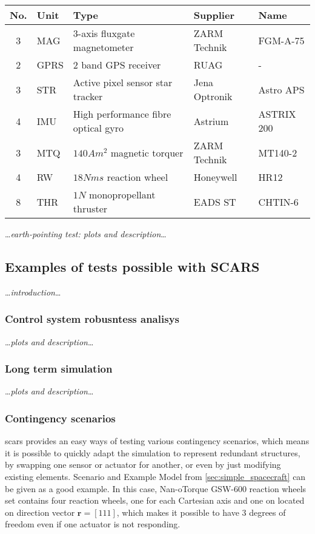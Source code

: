     \begin{center}    
        \small
        \begin{tabularx}{\textwidth}{ c l X l l }
            \textbf{No.} & \textbf{Uni}t & \textbf{Type} & \textbf{Supplier} & \textbf{Name} \\ \hline
            3 & MAG & 3-axis fluxgate magnetometer & ZARM Technik & FGM-A-75 \\
            2 & GPRS & 2 band GPS receiver & RUAG & - \\
            3 & STR  & Active pixel sensor star tracker & Jena Optronik & Astro APS \\
            4 & IMU & High performance fibre optical gyro & Astrium & ASTRIX 200 \\
            3 & MTQ & $140 Am^2$ magnetic torquer & ZARM Technik & MT140-2\\
            4 & RW & $18 Nms$ reaction wheel & Honeywell & HR12 \\
            8 & THR & $1N$ monopropellant thruster & EADS ST &CHTIN-6
        \end{tabularx}
    \end{center}\label{table:sentinel-adcs}

    \dots\textit{earth-pointing test: plots and description}\dots

\subsection{Examples of tests possible with SCARS}
    \dots\textit{introduction}\dots

    \subsubsection{Control system robusntess analisys}
    
        \dots\textit{plots and description}\dots
        

    \subsubsection{Long term simulation}
        \dots\textit{plots and description}\dots

    \subsubsection{Contingency scenarios}
        \ac{scars} provides an easy ways of testing various contingency scenarios, which means it is possible to quickly adapt the simulation to represent redundant structures, by swapping one sensor or actuator for another, or even by just modifying existing elements. Scenario and Example Model from \autoref{sec:simple_spacecraft} can be given as a good example. In this case,  Nan-oTorque GSW-600 reaction wheels set contains four reaction wheels, one for each Cartesian axis and one on located on direction vector $\textbf{r} = [1 1 1]$, which makes it possible to have 3 degrees of freedom even if one actuator is not responding.

